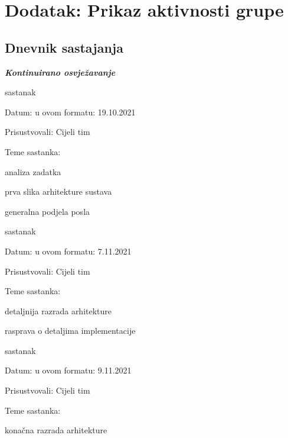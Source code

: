 \chapter*{Dodatak: Prikaz aktivnosti grupe}
		
		\section*{Dnevnik sastajanja}
		
		\textbf{\textit{Kontinuirano osvježavanje}}\\
		
	
		
		\begin{packed_enum}
			\item  sastanak
			
			\item[] \begin{packed_item}
				\item Datum: u ovom formatu: 19.10.2021
				\item Prisustvovali: Cijeli tim
				\item Teme sastanka:
				\begin{packed_item}
					\item  analiza zadatka
					\item  prva slika arhitekture sustava
					\item  generalna podjela posla
				\end{packed_item}
			\end{packed_item}
			
			\item  sastanak
			\item[] \begin{packed_item}
				\item Datum: u ovom formatu: 7.11.2021
				\item Prisustvovali: Cijeli tim
				\item Teme sastanka:
				\begin{packed_item}
					\item  detaljnija razrada arhitekture
					\item  rasprava o detaljima implementacije

				\end{packed_item}
			\end{packed_item}
		
		
		\item  sastanak
		\item[] \begin{packed_item}
			\item Datum: u ovom formatu: 9.11.2021
			\item Prisustvovali: Cijeli tim
			\item Teme sastanka:
			\begin{packed_item}
				\item  konačna razrada arhitekture
			\end{packed_item}
		\end{packed_item}
	

\end{packed_enum}
